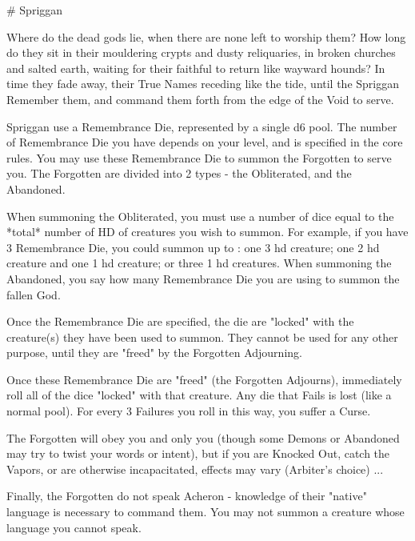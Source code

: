 


# Spriggan








Where do the dead gods lie, when there are none left to worship them? How long do they sit in their mouldering crypts and dusty reliquaries, in broken churches and salted earth, waiting for their faithful to return like wayward hounds?  In time they fade away, their True Names receding like the tide, until the Spriggan Remember them, and command them forth from the edge of the Void to serve.


Spriggan use a Remembrance Die, represented by a single d6 {pool}. The number of Remembrance Die you have depends on your level, and is specified in the core rules.  You may use these Remembrance Die to summon the Forgotten to serve you. The Forgotten are divided into 2 types - the Obliterated, and the Abandoned.

When summoning the Obliterated, you must use a number of dice equal to the *total* number of HD of creatures you wish to summon.  For example, if you have 3 Remembrance Die, you could summon up to : one 3 {hd} creature; one 2 {hd} creature and one 1 {hd} creature;  or three 1 {hd} creatures.  When summoning the Abandoned, you say how many Remembrance Die you are using to summon the fallen God.  

Once the Remembrance Die are specified, the die are "locked" with the creature(s) they have been used to summon.  They cannot be used for any other purpose, until they are "freed" by the Forgotten Adjourning.



Once these Remembrance Die are "freed" (the Forgotten Adjourns), immediately roll all of the dice "locked" with that creature.  Any die that Fails is lost (like a normal {pool}).  For every 3 Failures you roll in this way, you suffer a Curse.

The Forgotten will obey you and only you (though some Demons or Abandoned may try to twist your words or intent), but if you are Knocked Out, catch the Vapors, or are otherwise incapacitated, effects may vary (Arbiter's choice) ...

Finally, the Forgotten do not speak Acheron - knowledge of their "native" language is necessary to command them.  You may not summon a creature whose language you cannot speak.  



